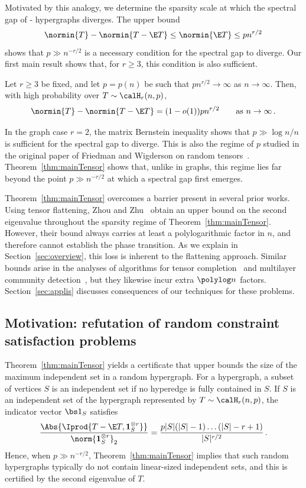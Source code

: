 \documentclass[11pt,a4paper]{article}
\begin{document}
Motivated by this analogy, we determine
the sparsity scale at which
the spectral gap of \Erdos-\Renyi
hypergraphs diverges.
The upper bound 
\[
    \normin{T}-\normin{T-\E T}\le \normin{\E T}\le pn^{r/2}
\] 
shows
that $p\gg n^{-r/2}$ is a necessary condition
for the spectral gap to diverge.
Our first main result shows that, for $r\ge 3$, this condition is
also sufficient.

\begin{theorem}
    \label{thm:mainTensor}
    Let $r\ge 3$ be fixed, and let $p=p(n)$ be such that $pn^{r/2}\to\infty$ as $n\to\infty$. Then,
    with high probability over $T\sim \calH_r(n,p)$,
    \[
        \normin{T} - \normin{T - \E T} = (1-o(1)) pn^{r/2}\qquad \text{as $n\to\infty$}\,.
    \]
\end{theorem}

In the graph case $r=2$, the matrix Bernstein inequality
shows that $p\gg \log n/n$ is sufficient for
the spectral gap to diverge.
This is also the regime of $p$
studied in the original paper of Friedman
and Wigderson on random tensors~\cite{friedmanWigderson}.
Theorem~\ref{thm:mainTensor} shows that, unlike in graphs, this regime
lies far beyond the point $p \gg n^{-r/2}$ at which a spectral gap first emerges.

Theorem~\ref{thm:mainTensor} overcomes
a barrier present in several prior works. Using tensor flattening,
Zhou and Zhu~\cite[Theorem 2.3]{sparseTensorZhou} obtain an upper bound on the
second eigenvalue throughout the sparsity regime of
Theorem~\ref{thm:mainTensor}. 
However, their bound always carries at least a
polylogarithmic factor in $n$, and therefore cannot establish the phase
transition. As we explain in Section~\ref{sec:overview}, this loss is
inherent to the flattening approach.
Similar bounds arise in the analyses of
algorithms for tensor completion~\cite[Theorem 2.1]{tensorCompletionJain} and multilayer community
detection~\cite[Theorem 2]{multiLayerSBM},
but they likewise incur extra
$\polylog n$ factors. Section~\ref{sec:applis} discusses consequences of our techniques for these problems.

\subsection{Motivation: refutation of random constraint satisfaction problems}
\label{sec:refutation}

Theorem~\ref{thm:mainTensor} yields a certificate that upper bounds the size of the maximum
independent set in a random hypergraph. 
For a hypergraph, a subset of vertices $S$ is an independent set if no
hyperedge is fully contained in $S$. If $S$ is an independent set of the hypergraph represented by $T \sim \calH_r(n,p)$, the
indicator vector $\bs 1_S$ satisfies
\[
    \frac{\Abs{\Iprod{ T - \E  T,  \mathbf 1_S^{\otimes r}}}} {\norm{\mathbf 1_S^{\otimes r}}_2} = \frac{p|S|(|S|-1)\ldots(|S|-r+1)} {|S|^{r/2}}\,.
\]
Hence, when $p \gg n^{-r/2}$, Theorem~\ref{thm:mainTensor} implies that such random hypergraphs typically do not contain
linear-sized independent sets, and this is
certified by the second eigenvalue of
$ T$.
\end{document}
